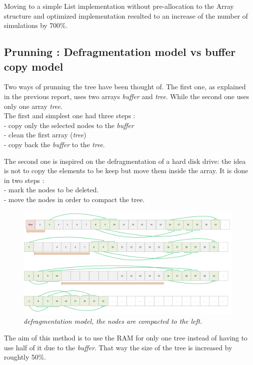 Moving to a simple List implementation without pre-allocation to the Array structure and optimized implementation resulted to an increase of the number of simulations by 700\%.

\subsection{Prunning : Defragmentation model vs buffer copy model}

Two ways of prunning the tree have been thought of. The first one, as  explained in the previous report, uses two arrays \textit{buffer} and \textit{tree}. While the second one uses only one array \textit{tree}.
\medskip\\

The first and simplest one had three steps : \\
- copy only the selected nodes to the \textit{buffer} \\
- clean the first array (\textit{tree}) \\
- copy back the \textit{buffer} to the \textit{tree}.

\medskip
The second one is inspired on the defragmentation of a hard disk drive: the idea is not to copy the elements to be keep but move them inside the array. It is done in two steps : \\
- mark the nodes to be deleted. \\
- move the nodes in order to compact the tree.
\begin{figure}[H] 
\centerline{\includegraphics[width=\textwidth]{Optimisations/array.png}}
\caption{\label{fig:Defrag}\textit{defragmentation model, the nodes are compacted to the left.}}
\end{figure}
The aim of this method is to use the RAM for only one tree instead of having to use half of it due to the \textit{buffer}. That way the size of the tree is increased by roughtly 50\%.


